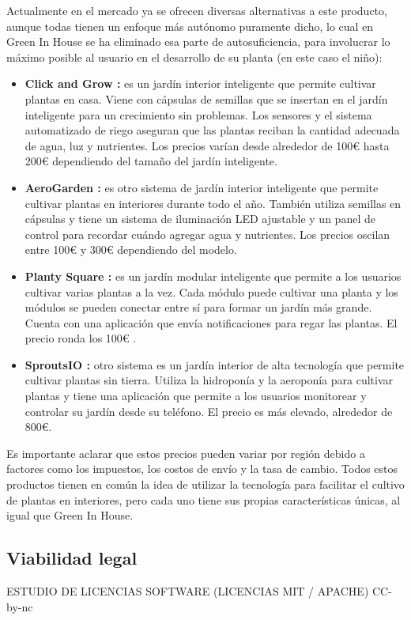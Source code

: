             Actualmente en el mercado ya se ofrecen diversas alternativas a este producto, aunque todas tienen un enfoque más autónomo puramente dicho, lo cual en Green In House se ha eliminado esa parte de autosuficiencia, para involucrar lo máximo posible al usuario  en el desarrollo de su planta (en este caso el niño):
            \begin{itemize}      
                \item \textbf{Click and Grow :} es un jardín interior inteligente que permite cultivar plantas en casa. Viene con cápsulas de semillas que se insertan en el jardín inteligente para un crecimiento sin problemas. Los sensores y el sistema automatizado de riego aseguran que las plantas reciban la cantidad adecuada de agua, luz y nutrientes. Los precios varían desde alrededor de 100€ hasta 200€ dependiendo del tamaño del jardín inteligente.
                \item \textbf{AeroGarden :} es otro sistema de jardín interior inteligente que permite cultivar plantas en interiores durante todo el año. También utiliza semillas en cápsulas y tiene un sistema de iluminación LED ajustable y un panel de control para recordar cuándo agregar agua y nutrientes. Los precios oscilan entre 100€ y 300€ dependiendo del modelo.
                \item \textbf{Planty Square :} es un jardín modular inteligente que permite a los usuarios cultivar varias plantas a la vez. Cada módulo puede cultivar una planta y los módulos se pueden conectar entre sí para formar un jardín más grande. Cuenta con una aplicación que envía notificaciones para regar las plantas. El precio ronda los 100€ .
                \item \textbf{SproutsIO :} otro sistema es un jardín interior de alta tecnología que permite cultivar plantas sin tierra. Utiliza la hidroponía y la aeroponía para cultivar plantas y tiene una aplicación que permite a los usuarios monitorear y controlar su jardín desde su teléfono. El precio es más elevado, alrededor de 800€.
            \end{itemize}
            Es importante aclarar que estos precios pueden variar por región debido a factores como los impuestos, los costos de envío y la tasa de cambio. Todos estos productos tienen en común la idea de utilizar la tecnología para facilitar el cultivo de plantas en interiores, pero cada uno tiene sus propias características únicas, al igual que Green In House. 
    
    
    \subsection{Viabilidad legal}
    ESTUDIO DE LICENCIAS SOFTWARE
    (LICENCIAS MIT / APACHE)
    CC-by-nc
    
    